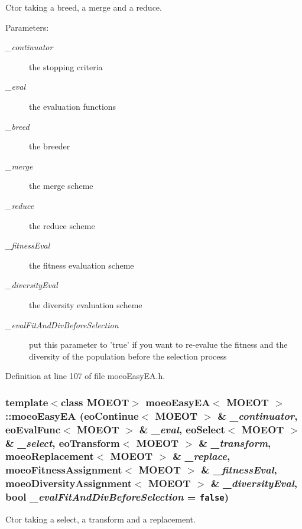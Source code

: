 Ctor taking a breed, a merge and a reduce. 

\begin{Desc}
\item[Parameters:]
\begin{description}
\item[{\em \_\-continuator}]the stopping criteria \item[{\em \_\-eval}]the evaluation functions \item[{\em \_\-breed}]the breeder \item[{\em \_\-merge}]the merge scheme \item[{\em \_\-reduce}]the reduce scheme \item[{\em \_\-fitness\-Eval}]the fitness evaluation scheme \item[{\em \_\-diversity\-Eval}]the diversity evaluation scheme \item[{\em \_\-eval\-Fit\-And\-Div\-Before\-Selection}]put this parameter to 'true' if you want to re-evalue the fitness and the diversity of the population before the selection process \end{description}
\end{Desc}


Definition at line 107 of file moeo\-Easy\-EA.h.
\subsubsection{\setlength{\rightskip}{0pt plus 5cm}template$<$class MOEOT$>$ \bf{moeo\-Easy\-EA}$<$ MOEOT $>$::\bf{moeo\-Easy\-EA} (\bf{eo\-Continue}$<$ MOEOT $>$ \& {\em \_\-continuator}, \bf{eo\-Eval\-Func}$<$ MOEOT $>$ \& {\em \_\-eval}, \bf{eo\-Select}$<$ MOEOT $>$ \& {\em \_\-select}, \bf{eo\-Transform}$<$ MOEOT $>$ \& {\em \_\-transform}, \bf{moeo\-Replacement}$<$ MOEOT $>$ \& {\em \_\-replace}, \bf{moeo\-Fitness\-Assignment}$<$ MOEOT $>$ \& {\em \_\-fitness\-Eval}, \bf{moeo\-Diversity\-Assignment}$<$ MOEOT $>$ \& {\em \_\-diversity\-Eval}, bool {\em \_\-eval\-Fit\-And\-Div\-Before\-Selection} = {\tt false})\hspace{0.3cm}{\tt  [inline]}}\label{classmoeoEasyEA_27f0db7a608636c904305afa11cd6ae1}


Ctor taking a select, a transform and a replacement. 

